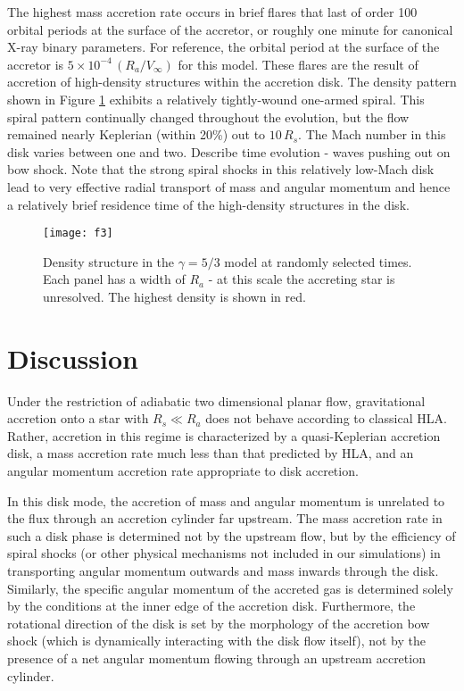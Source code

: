 \documentclass{emulateapj}
\begin{document}
The highest mass accretion rate
occurs in brief flares that last of order 100 orbital periods at the surface of the accretor, or roughly one minute for
canonical X-ray binary parameters.  For reference, the orbital period at the surface of the accretor
is $5\times 10^{-4}\,(R_a/V_\infty)$ for this model.  
These flares are the result of accretion of high-density structures within the accretion disk.
The density pattern shown in Figure \ref{fig:disks}
exhibits a relatively tightly-wound one-armed spiral.  This spiral pattern continually changed throughout the evolution, but the flow
remained nearly Keplerian (within 20\%) out to $10\, R_s$.  The Mach number in this disk varies between one and two.  
Describe time evolution - waves pushing out on bow shock.  Note that the strong spiral shocks in this relatively low-Mach disk lead to 
very effective radial transport of mass and angular momentum and hence a relatively brief residence time of the high-density 
structures in the disk.  

\begin{figure}[!htp]
\begin{center}
\texttt{[image: f3]}
\caption{Density structure in the $\gamma=5/3$ model at randomly selected times.  Each panel has a width of $R_a$ - at this scale
the accreting star is unresolved.  The highest density is shown in red.}
\label{fig:disks}
\end{center}\end{figure}



\section{Discussion}

Under the restriction of adiabatic two dimensional planar flow, gravitational accretion onto a star with $R_s \ll R_a$ does not behave according to 
classical HLA. Rather, accretion in this regime is characterized by a quasi-Keplerian
accretion disk, a mass accretion rate much less than that predicted by HLA, and an angular momentum accretion rate appropriate to
disk accretion.

In this disk mode, the accretion of mass and angular momentum is unrelated to the flux through an accretion cylinder far upstream.
The mass accretion rate in such a disk phase is determined not by the upstream flow, but by the efficiency of 
spiral shocks (or other physical mechanisms not included in our simulations) in transporting angular momentum 
outwards and mass inwards through the disk.  Similarly, the specific angular momentum of the accreted gas is determined solely by
the conditions at the inner edge of the accretion disk.  Furthermore, the rotational direction of the disk is set by the 
morphology of the accretion bow shock (which is dynamically interacting with the disk flow itself),
not by the presence of a net angular momentum flowing through an upstream accretion cylinder. 
\end{document}
